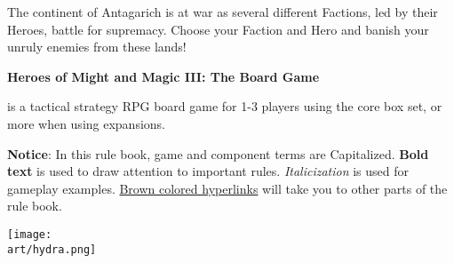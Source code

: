 
\bigbreak

The continent of Antagarich is at war as several different Factions, led by their Heroes, battle for supremacy. Choose your Faction and Hero and banish your unruly enemies from these lands!

\hypertarget{Heroes of Might and Magic III}{\textbf{Heroes of Might and Magic III: The Board Game}} is a tactical strategy RPG board game for 1-3 players using the core box set, or more when using expansions.

\begin{multicols}{2}
\textbf{Notice}: In this rule book, game and component terms are Capitalized.
\textbf{Bold text} is used to draw attention to important rules.
\textit{Italicization} is used for gameplay examples.
\hyperlink{Heroes of Might and Magic III}{Brown colored hyperlinks} will take you to other parts of the rule book.
\phantom{
  
  
  
  
  
}
\vfill
\columnbreak
{}
\vfill
\end{multicols}

\begin{scaledfigure}[blanker]
  \centering
  \texttt{[image: \\art/hydra.png]}
\end{scaledfigure}
